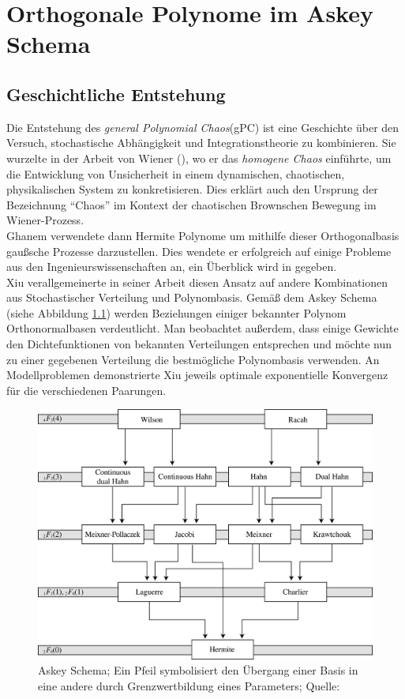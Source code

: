 
\chapter{Orthogonale Polynome im Askey Schema} %

\label{AppendixA} %

\section{Geschichtliche Entstehung}
Die Entstehung des \emph{general Polynomial Chaos}(gPC) ist eine Geschichte über den Versuch, stochastische Abhängigkeit und Integrationstheorie zu kombinieren. Sie wurzelte in der Arbeit von Wiener (\autocite{norbertwiener1938}), wo er das \emph{homogene Chaos} einführte, um die Entwicklung von Unsicherheit in einem dynamischen, chaotischen, physikalischen System zu konkretisieren. Dies erklärt auch den Ursprung der Bezeichnung "`Chaos"' im Kontext der chaotischen Brownschen Bewegung im Wiener-Prozess.\\
Ghanem verwendete dann Hermite Polynome um mithilfe dieser Orthogonalbasis gaußsche Prozesse darzustellen. Dies wendete er erfolgreich auf einige Probleme aus den Ingenieurswissenschaften an, ein Überblick wird in \autocite{GhaSpa91} gegeben.\\
Xiu verallgemeinerte in seiner Arbeit \autocite{xiu2002} diesen Ansatz auf andere Kombinationen aus Stochastischer Verteilung und Polynombasis. Gemäß dem Askey Schema (siehe Abbildung \ref{askeyscheme}) werden Beziehungen einiger bekannter Polynom Orthonormalbasen verdeutlicht. Man beobachtet außerdem, dass einige Gewichte den Dichtefunktionen von bekannten Verteilungen entsprechen und möchte nun zu einer gegebenen Verteilung die bestmögliche Polynombasis verwenden. An Modellproblemen demonstrierte Xiu jeweils optimale exponentielle Konvergenz für die verschiedenen Paarungen.\\
\begin{figure}
\center
\includegraphics[width=0.8\linewidth]{Figures/askeyscheme.png}
\caption{Askey Schema; Ein Pfeil symbolisiert den Übergang einer Basis in eine andere durch Grenzwertbildung eines Parameters; Quelle: \autocite{webaskey}}
\label{askeyscheme}
\end{figure}
